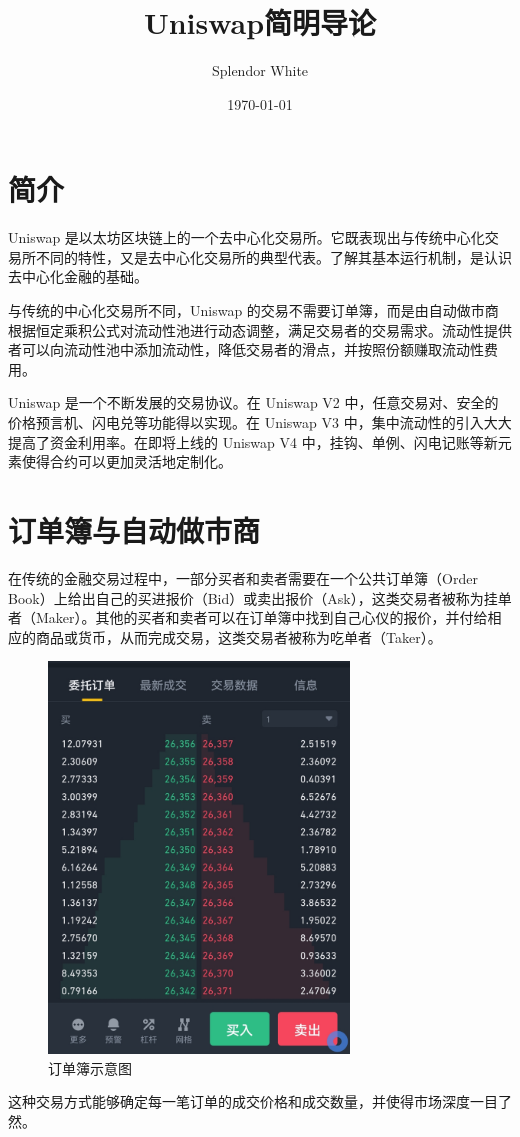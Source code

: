 \documentclass[12pt, a4paper, oneside]{ctexart}
\title{Uniswap简明导论}
\author{Splendor White}
\date{\today}
\begin{document}
\maketitle

\section{简介}

Uniswap 是以太坊区块链上的一个去中心化交易所。它既表现出与传统中心化交易所不同的特性，又是去中心化交易所的典型代表。了解其基本运行机制，是认识去中心化金融的基础。

与传统的中心化交易所不同，Uniswap 的交易不需要订单簿，而是由自动做市商根据恒定乘积公式对流动性池进行动态调整，满足交易者的交易需求。流动性提供者可以向流动性池中添加流动性，降低交易者的滑点，并按照份额赚取流动性费用。

Uniswap 是一个不断发展的交易协议。在 Uniswap V2 中，任意交易对、安全的价格预言机、闪电兑等功能得以实现。在 Uniswap V3 中，集中流动性的引入大大提高了资金利用率。在即将上线的 Uniswap V4 中，挂钩、单例、闪电记账等新元素使得合约可以更加灵活地定制化。

\section{订单簿与自动做市商}

在传统的金融交易过程中，一部分买者和卖者需要在一个公共订单簿（Order Book）上给出自己的买进报价（Bid）或卖出报价（Ask），这类交易者被称为挂单者（Maker）。其他的买者和卖者可以在订单簿中找到自己心仪的报价，并付给相应的商品或货币，从而完成交易，这类交易者被称为吃单者（Taker）。

\begin{figure}[htbp]
    \centering
    \includegraphics[width=8cm]{订单簿示意图.jpg}
    \caption{订单簿示意图}
\end{figure}

这种交易方式能够确定每一笔订单的成交价格和成交数量，并使得市场深度一目了然。
\end{document}
